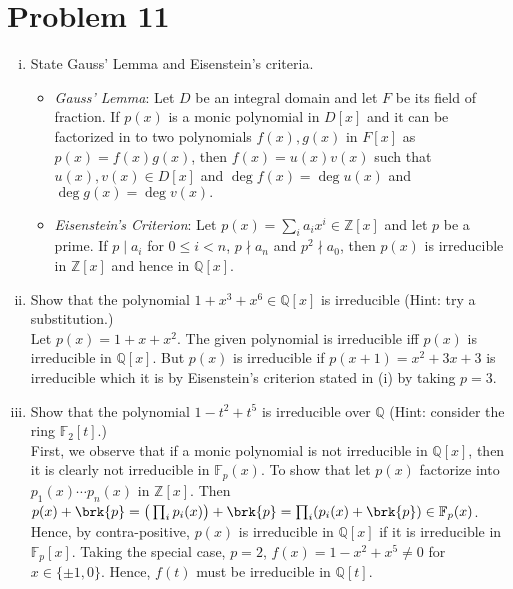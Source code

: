 \documentclass[12pt]{article}
\begin{document}
\section*{Problem 11}
\begin{enumerate}[(i)]
    \item State Gauss’ Lemma and Eisenstein’s criteria.\\
    
    \begin{itemize}
        \item \textit{Gauss' Lemma}: Let $D$ be an integral domain and let $F$ be its field of fraction. If $p(x)$ is a monic polynomial in $D[x]$ and it can be factorized in to two polynomials $f(x), g(x)$ in $F[x]$ as $p(x) = f(x)g(x)$, then $f(x)= u(x)v(x)$ such that $u(x), v(x) \in D[x]$ and $\deg f(x) = \deg u(x)$ and $\deg g(x) = \deg v(x).$

        \item \textit{Eisenstein's Criterion}: Let $p(x) = \sum_i a_ix^i \in \mathbb{Z}[x]$ and let $p$ be a prime. If $p \mid a_i$ for $0 \leq i < n$, $p \nmid a_n$ and $p^2 \nmid a_0$, then $p(x)$ is irreducible in $\mathbb{Z}[x]$ and hence in $\mathbb{Q}[x].$
    \end{itemize}
    \item Show that the polynomial $1 + x^3 + x^6 \in \mathbb{Q}[x]$ is irreducible (Hint: try a substitution.)\\

    \noindent Let $p(x) = 1 + x + x^2.$ The given polynomial is irreducible iff $p(x)$ is irreducible in $\mathbb{Q}[x].$ But $p(x)$ is irreducible if $p(x+1) = x^2 + 3x + 3$ is irreducible which it is by Eisenstein's criterion stated in (i) by taking $p = 3.$

    \item Show that the polynomial $1 - t^2 + t^5$ is irreducible over $\mathbb{Q}$ (Hint: consider the ring $\mathbb{F}_{2}[t]$.)\\

    \noindent First, we observe that if a monic polynomial is not irreducible in $\mathbb{Q}[x]$, then it is clearly not irreducible in $\mathbb{F}_p(x)$. To show that let $p(x)$ factorize into $p_1(x) \cdots p_n(x)$ in $\mathbb{Z}[x]$. Then $p(x) + \brk{p} = \big(\prod_i p_i(x) \big) + \brk{p} = \prod_i (p_i(x) + \brk{p}) \in \mathbb{F}_p(x)$. Hence, by contra-positive, $p(x)$ is irreducible in $\mathbb{Q}[x]$ if it is irreducible in $\mathbb{F}_p[x]$. Taking the special case, $p = 2$, $f(x) = 1 - x^2 + x^5 \neq 0$ for $x \in \{\pm 1, 0\}.$ Hence, $f(t)$ must be irreducible in $\mathbb{Q}[t].$
    

\end{enumerate}
\end{document}
